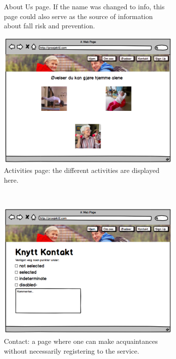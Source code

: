 \begin{figure}[H]
\begin{subfigure}{.5\textwidth}
  \caption{About Us page. If the name was changed to info, this page could also serve as the source of information about fall risk and prevention.}
  \label{fig:videoAbout}
\end{subfigure}%
\begin{subfigure}{.5\textwidth}
  \centering
  \includegraphics[width=.8\linewidth]{wireframes/web/Activities}
  \caption{Activities page: the different activities are displayed here.}
  \label{fig:videoACtivities}
\end{subfigure}\\
\break
\begin{subfigure}{.5\textwidth}
  \centering
  \includegraphics[width=.8\linewidth]{wireframes/web/Contact}
  \caption{Contact: a page where one can make acquaintances without necessarily registering to the service. }
  \label{fig:videoContact}
\end{subfigure}%
\begin{subfigure}{.5\textwidth}
  \centering

\end{subfigure}
\end{figure}
